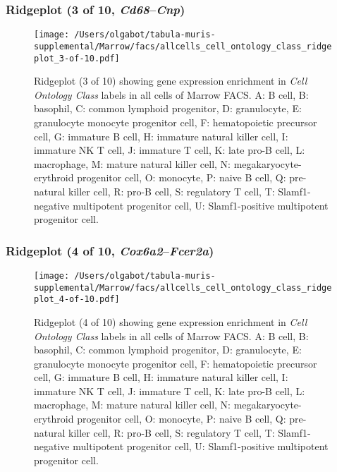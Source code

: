 \subsubsection{Ridgeplot (3 of 10, \emph{Cd68}--\emph{Cnp})}
\begin{figure}[h]
\centering
\texttt{[image: /Users/olgabot/tabula-muris-supplemental/Marrow/facs/allcells\_cell\_ontology\_class\_ridgeplot\_3-of-10.pdf]}

\caption{ Ridgeplot (3 of 10)  showing gene expression enrichment in \emph{Cell Ontology Class} labels in all cells of Marrow FACS. A: B cell, B: basophil, C: common lymphoid progenitor, D: granulocyte, E: granulocyte monocyte progenitor cell, F: hematopoietic precursor cell, G: immature B cell, H: immature natural killer cell, I: immature NK T cell, J: immature T cell, K: late pro-B cell, L: macrophage, M: mature natural killer cell, N: megakaryocyte-erythroid progenitor cell, O: monocyte, P: naive B cell, Q: pre-natural killer cell, R: pro-B cell, S: regulatory T cell, T: Slamf1-negative multipotent progenitor cell, U: Slamf1-positive multipotent progenitor cell.}
\end{figure}


\clearpage

\subsubsection{Ridgeplot (4 of 10, \emph{Cox6a2}--\emph{Fcer2a})}
\begin{figure}[h]
\centering
\texttt{[image: /Users/olgabot/tabula-muris-supplemental/Marrow/facs/allcells\_cell\_ontology\_class\_ridgeplot\_4-of-10.pdf]}

\caption{ Ridgeplot (4 of 10)  showing gene expression enrichment in \emph{Cell Ontology Class} labels in all cells of Marrow FACS. A: B cell, B: basophil, C: common lymphoid progenitor, D: granulocyte, E: granulocyte monocyte progenitor cell, F: hematopoietic precursor cell, G: immature B cell, H: immature natural killer cell, I: immature NK T cell, J: immature T cell, K: late pro-B cell, L: macrophage, M: mature natural killer cell, N: megakaryocyte-erythroid progenitor cell, O: monocyte, P: naive B cell, Q: pre-natural killer cell, R: pro-B cell, S: regulatory T cell, T: Slamf1-negative multipotent progenitor cell, U: Slamf1-positive multipotent progenitor cell.}
\end{figure}


\clearpage

